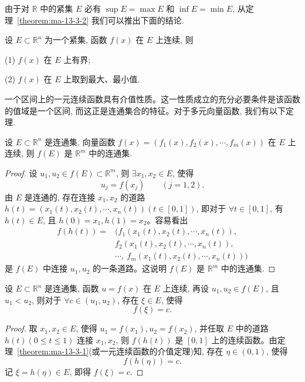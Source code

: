 由于对 $\mathbb R$ 中的紧集 $E$ 必有 $\sup E=\max E$ 和 $\inf E=\min E$, 从定理~\ref{theorem:ma-13-3-2} 我们可以推出下面的结论.

\begin{corollary}\label{corollary:ma-13-source-71}
设 $E\subset\mathbb R^n$ 为一个紧集, 函数 $f(x)$ 在 $E$ 上连续, 则

(1) $f(x)$ 在 $E$ 上有界;

(2) $f(x)$ 在 $E$ 上取到最大、最小值.
\end{corollary}

一个区间上的一元连续函数具有介值性质。这一性质成立的充分必要条件是该函数的值域是一个区间, 而这正是连通集合的特征。对于多元向量函数, 我们有以下定理.

\begin{theorem}\label{theorem:ma-13-3-3}
设 $E\subset\mathbb R^n$ 是连通集, 向量函数 $f(x)=(f_1(x),f_2(x),\cdots,f_m(x))$ 在 $E$ 上连续, 则 $f(E)$ 是 $\mathbb R^m$ 中的连通集.
\end{theorem}


\begin{proof}
设 $u_1,u_2\in f(E)\subset\mathbb R^m$, 则 $\exists x_1,x_2\in E$, 使得
\[
  u_j=f(x_j)\qquad (j=1,2).
\]
由 $E$ 是连通的, 存在连接 $x_1,x_2$ 的道路 $h(t)=(x_1(t),x_2(t),\cdots,x_n(t))(t\in[0,1])$, 即对于 $\forall t\in[0,1]$, 有 $h(t)\in E$, 且 $h(0)=x_1,h(1)=x_2$。容易看出
\[
\begin{aligned}
  f(h(t))={}&(f_1(x_1(t),x_2(t),\cdots,x_n(t)),\\
  &f_2(x_1(t),x_2(t),\cdots,x_n(t)),\\
  &\cdots,\ f_m(x_1(t),x_2(t),\cdots,x_n(t)))
\end{aligned}
\]
是 $f(E)$ 中连接 $u_1,u_2$ 的一条道路。这说明 $f(E)$ 是 $\mathbb R^m$ 中的连通集.
\end{proof}


\begin{corollary}\label{corollary:ma-13-source-74}
设 $E\subset\mathbb R^n$ 是连通集, 函数 $u=f(x)$ 在 $E$ 上连续, 再设 $u_1,u_2\in f(E)$, 且 $u_1<u_2$, 则对于 $\forall c\in(u_1,u_2)$, 存在 $\xi\in E$, 使得
\[
  f(\xi)=c.
\]
\end{corollary}


\begin{proof}
取 $x_1,x_2\in E$, 使得 $u_1=f(x_1),u_2=f(x_2)$, 并任取 $E$ 中的道路 $h(t)(0\leqslant t\leqslant1)$ 连接 $x_1,x_2$, 则 $f(h(t))$ 是 $[0,1]$ 上的连续函数。由定理~\ref{theorem:ma-13-3-1}(或一元连续函数的介值定理)知, 存在 $\eta\in(0,1)$, 使得
\[
  f(h(\eta))=c.
\]
记 $\xi=h(\eta)\in E$, 即得 $f(\xi)=c$.
\end{proof}


